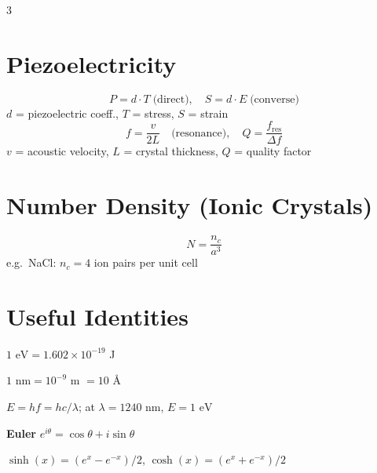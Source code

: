 \documentclass[9pt]{extarticle}
\newcommand{\eqlabel}[1]{\textbf{\scriptsize #1}\;}
\newcommand{\vardef}[1]{{\footnotesize\color{defgray}#1}}
\begin{document}
\begin{multicols}{3}
\section{Piezoelectricity}
\[P = d\cdot T \;\text{(direct)},\quad S = d\cdot E \;\text{(converse)}\]
\vardef{$d$ = piezoelectric coeff., $T$ = stress, $S$ = strain}
\[f = \frac{v}{2L} \quad\text{(resonance)},\quad Q = \frac{f_{\text{res}}}{\Delta f}\]
\vardef{$v$ = acoustic velocity, $L$ = crystal thickness, $Q$ = quality factor}

\section{Number Density (Ionic Crystals)}
\[N = \frac{n_c}{a^3}\]
\vardef{e.g.\ NaCl: $n_c = 4$ ion pairs per unit cell}

\section{Useful Identities}
$1\text{ eV} = 1.602\times10^{-19}$ J

$1\text{ nm} = 10^{-9}$ m $= 10$ \AA

$E = hf = hc/\lambda$; at $\lambda = 1240\text{ nm}$, $E = 1\text{ eV}$

\eqlabel{Euler} $e^{i\theta} = \cos\theta + i\sin\theta$

$\sinh(x) = (e^x - e^{-x})/2$, \; $\cosh(x) = (e^x + e^{-x})/2$

\end{multicols}
\end{document}
